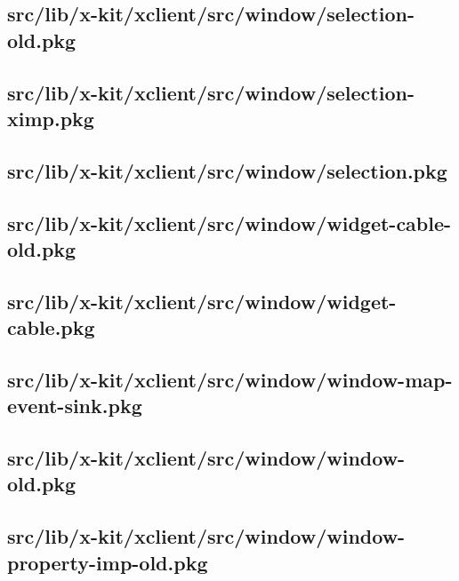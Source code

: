\subsection{src/lib/x-kit/xclient/src/window/selection-old.pkg}


\subsection{src/lib/x-kit/xclient/src/window/selection-ximp.pkg}


\subsection{src/lib/x-kit/xclient/src/window/selection.pkg}


\subsection{src/lib/x-kit/xclient/src/window/widget-cable-old.pkg}


\subsection{src/lib/x-kit/xclient/src/window/widget-cable.pkg}


\subsection{src/lib/x-kit/xclient/src/window/window-map-event-sink.pkg}


\subsection{src/lib/x-kit/xclient/src/window/window-old.pkg}


\subsection{src/lib/x-kit/xclient/src/window/window-property-imp-old.pkg}


